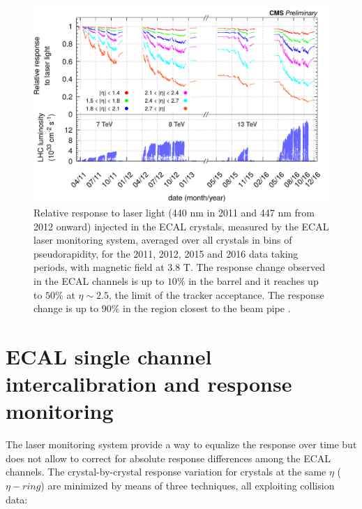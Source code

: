 \begin{figure}[h!]
  \centering
  \includegraphics[width = .9\textwidth]{figures/ecal/histories_2011-2012-2015-2016_161212.png}
  \caption{Relative response to laser light (440 nm in 2011 and 447 nm from
    2012 onward) injected in the ECAL crystals, measured by the ECAL
    laser monitoring system, averaged over all crystals in bins of
    pseudorapidity, for the 2011, 2012, 2015 and 2016 data taking periods,
    with magnetic field at 3.8 T. The response change observed in the
    ECAL channels is up to $10\%$ in the barrel and it reaches up to $50\%$ at $\eta\sim 2.5$,
    the limit of the tracker acceptance. The response change is up to $90\%$ in the region closest to the beam pipe
    \cite{laser_and_phisym}.}
  \label{fig:laser}
\end{figure}

\section{ECAL single channel intercalibration and response monitoring}
\label{sec:minchia_la_calibrazione}

The laser monitoring system provide a way to equalize the response over time but does not allow to
correct for absolute response differences among the ECAL channels. The crystal-by-crystal response variation
for crystals at the same $\eta$ ($\eta-ring$) are minimized by means of three techniques, all exploiting collision data:


